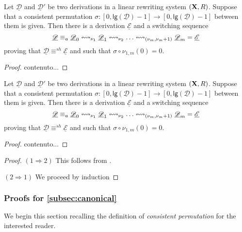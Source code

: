 \documentclass[a4paper,UKenglish,cleveref,pdftex,thm-restate,numberwithinsect,anonymous]{lipics}
\def\R{\mathsf{R}}
\def\X{\textbf {\textup{X}}}
\newcommand{\dder}[1]{\mathscr{#1}}
\newcommand{\der}[1]{\underline{\dder{#1}}}
\newcommand{\lgh}[0]{\mathsf{lg}}
\newcommand{\shift}[1]{\ensuremath{\mathrel{{\leftrightsquigarrow}_{#1}}}}
\begin{document}
\begin{lemma}\label{lem:fix1}
	Let $\der{D}$ and $\der{D}'$ be two derivations in a linear rewriting system $(\X, \R)$. Suppose that a consistent permutation $\sigma:[0, \lgh(\der{D})-1]\to [0, \lgh(\der{D})-1]$ between them is given. Then there is a derivation $\der{E}$ and a switching sequence 
	  \[\der{D}\equiv_a \der{D}_0 \shift{\nu_1} \der{D}_1 \shift{\nu_2} \ldots \shift{\transp{\nu_m}}
	\der{D}_m = \der{E}\]
proving that  $\der{D}\equiv^{sh} \der{E}$ and such that $\sigma\circ \nu_{1,m}(0)=0$.
\end{lemma}
\begin{proof}
	contenuto...
\end{proof}



\begin{lemma}\label{lem:fix2}
	Let $\der{D}$ and $\der{D}'$ be two derivations in a linear rewriting system $(\X, \R)$. Suppose that a consistent permutation $\sigma:[0, \lgh(\der{D})-1]\to [0, \lgh(\der{D})-1]$ between them is given. Then there is a derivation $\der{E}$ and a switching sequence 
	\[\der{D}\equiv_a \der{D}_0 \shift{\nu_1} \der{D}_1 \shift{\nu_2} \ldots \shift{\transp{\nu_m}}
	\der{D}_m = \der{E}\]
	proving that  $\der{D}\equiv^{sh} \der{E}$ and such that $\sigma\circ \nu_{1,m}(0)=0$.
\end{lemma}
\begin{proof}
	contenuto...
\end{proof}


\thmcoswitch*
\label{thmswitch-proof}
\begin{proof}$(1\Rightarrow 2)$ This follows from .

\smallskip \noindent $(2\Rightarrow 1)$ We proceed by induction
\end{proof}
\fi 


\subsubsection{Proofs for \cref{subsec:canonical}}


We begin this section recalling the definition of \emph{consistent permutation}  for the interested reader.
\end{document}
